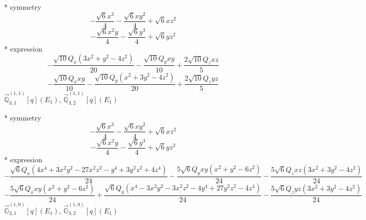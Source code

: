 \documentclass[fleqn,8pt]{jsarticle}
\begin{document}
\noindent\quad ** symmetry
\begin{dmath*}
- \frac{\sqrt{6} x^{3}}{4} - \frac{\sqrt{6} x y^{2}}{4} + \sqrt{6} x z^{2}
\end{dmath*}
\begin{dmath*}
- \frac{\sqrt{6} x^{2} y}{4} - \frac{\sqrt{6} y^{3}}{4} + \sqrt{6} y z^{2}
\end{dmath*}
\noindent\quad ** expression
\begin{dmath*}
- \frac{\sqrt{10} Q_{x} \left(3 x^{2} + y^{2} - 4 z^{2}\right)}{20} - \frac{\sqrt{10} Q_{y} x y}{10} + \frac{2 \sqrt{10} Q_{z} x z}{5}
\end{dmath*}
\begin{dmath*}
- \frac{\sqrt{10} Q_{x} x y}{10} - \frac{\sqrt{10} Q_{y} \left(x^{2} + 3 y^{2} - 4 z^{2}\right)}{20} + \frac{2 \sqrt{10} Q_{z} y z}{5}
\end{dmath*}
\noindent\quad $\vec{\mathbb{Q}}_{3,1}^{(1,1)}[q](E_{1})$, $\vec{\mathbb{Q}}_{3,2}^{(1,1)}[q](E_{1})$

\noindent\quad ** symmetry
\begin{dmath*}
- \frac{\sqrt{6} x^{3}}{4} - \frac{\sqrt{6} x y^{2}}{4} + \sqrt{6} x z^{2}
\end{dmath*}
\begin{dmath*}
- \frac{\sqrt{6} x^{2} y}{4} - \frac{\sqrt{6} y^{3}}{4} + \sqrt{6} y z^{2}
\end{dmath*}
\noindent\quad ** expression
\begin{dmath*}
- \frac{\sqrt{6} Q_{x} \left(4 x^{4} + 3 x^{2} y^{2} - 27 x^{2} z^{2} - y^{4} + 3 y^{2} z^{2} + 4 z^{4}\right)}{24} - \frac{5 \sqrt{6} Q_{y} x y \left(x^{2} + y^{2} - 6 z^{2}\right)}{24} - \frac{5 \sqrt{6} Q_{z} x z \left(3 x^{2} + 3 y^{2} - 4 z^{2}\right)}{24}
\end{dmath*}
\begin{dmath*}
- \frac{5 \sqrt{6} Q_{x} x y \left(x^{2} + y^{2} - 6 z^{2}\right)}{24} + \frac{\sqrt{6} Q_{y} \left(x^{4} - 3 x^{2} y^{2} - 3 x^{2} z^{2} - 4 y^{4} + 27 y^{2} z^{2} - 4 z^{4}\right)}{24} - \frac{5 \sqrt{6} Q_{z} y z \left(3 x^{2} + 3 y^{2} - 4 z^{2}\right)}{24}
\end{dmath*}
\noindent\quad $\vec{\mathbb{G}}_{3,1}^{(1,0)}[q](E_{1})$, $\vec{\mathbb{G}}_{3,2}^{(1,0)}[q](E_{1})$
\end{document}
